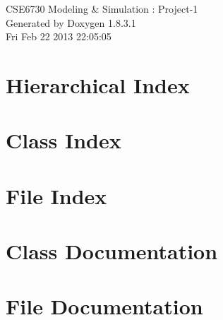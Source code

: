 \documentclass{book}
\begin{document}
\hypersetup{pageanchor=false,citecolor=blue}
\begin{titlepage}
\vspace*{7cm}
\begin{center}
{\Large C\-S\-E6730 Modeling \& Simulation \-: Project-\/1 }\\
\vspace*{1cm}
{\large Generated by Doxygen 1.8.3.1}\\
\vspace*{0.5cm}
{\small Fri Feb 22 2013 22:05:05}\\
\end{center}
\end{titlepage}
\clearemptydoublepage
{}
\tableofcontents
\clearemptydoublepage
{}
\hypersetup{pageanchor=true,citecolor=blue}
\chapter{Hierarchical Index}

\chapter{Class Index}

\chapter{File Index}

\chapter{Class Documentation}




















\chapter{File Documentation}
















\printindex
\end{document}
